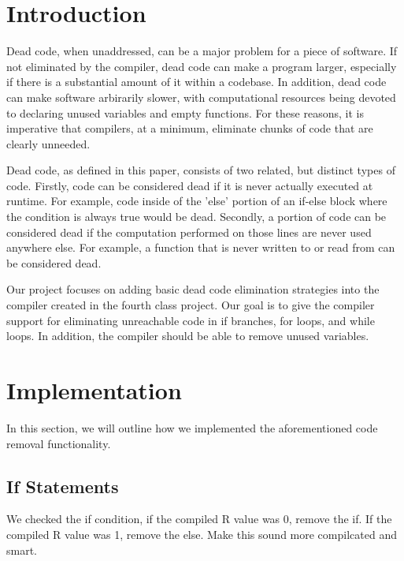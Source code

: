 \documentclass[sigconf]{acmart}
\begin{document}
\maketitle

\section{Introduction}
Dead code, when unaddressed, can be a major problem for a piece of software.
If not eliminated by the compiler, dead code can make a program 
larger, especially if there is a substantial amount of it within a codebase. In addition, dead code 
can make software arbirarily slower, with computational resources being devoted 
to declaring unused variables and empty functions. For these reasons, it is imperative that compilers, at 
a minimum, eliminate chunks of code that are clearly unneeded.

Dead code, as defined in this paper, consists of 
two related, but distinct types of code. Firstly, code can be considered dead if 
it is never actually executed at runtime. For example, code inside of the 'else' portion 
of an if-else block where the condition is always true would be dead. Secondly, a portion of 
code can be considered dead if the computation performed on those lines are never used anywhere else.
For example, a function that is never written to or read from can be considered dead. 

Our project focuses on adding basic dead code elimination strategies into the compiler 
created in the fourth class project. Our goal is to give the compiler support for eliminating
unreachable code in if branches, for loops, and while loops. In addition, the compiler should 
be able to remove unused variables.

\section{Implementation}
In this section, we will outline how we implemented the aforementioned code removal functionality. 

\subsection{If Statements}
We checked the if condition, if the compiled R value was 0, remove the if. If the compiled R value was 1, 
remove the else. Make this sound more compilcated and smart.
\end{document}
